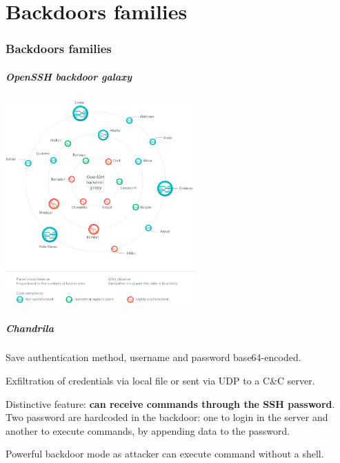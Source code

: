 \part{Backdoors families}
\section{Backdoors families}

\begin{frame}
	\partpage
\end{frame}

\begin{frame}
	\frametitle{OpenSSH backdoor galaxy}
	
   \begin{center}    
   \includegraphics[width=0.55\textwidth]{images/OpenSSH_backdoor_galaxy}
   \end{center}

\end{frame}


\begin{frame}
	\frametitle{Chandrila}
	
	Save authentication method, username and password base64-encoded.
	
	\bigskip
	
	Exfiltration of credentials via local file or sent via UDP to a C\&C server.
	
	\bigskip
	
	Distinctive feature: \textbf{can receive commands through the SSH password}.\\
	Two password are hardcoded in the backdoor: one to login in the server and another to execute commands, by appending data to the password.
	
	\bigskip

  Powerful backdoor mode as attacker can execute command without a shell.
  
\end{frame}


